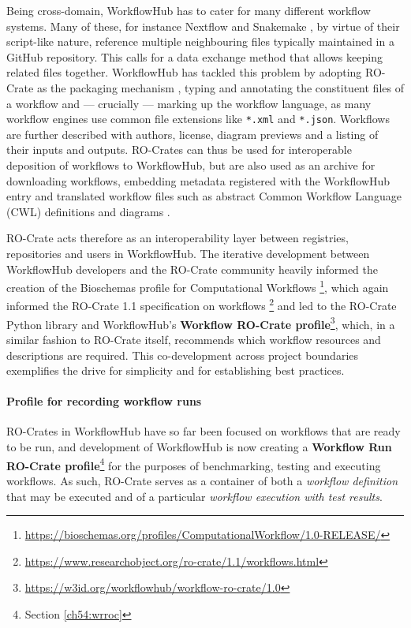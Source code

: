 Being cross-domain, WorkflowHub has to cater for many different workflow
systems. Many of these, for instance Nextflow
\cite{Di Tommaso 2017} and Snakemake
\cite{Koster 2012}, by
virtue of their script-like nature, reference multiple neighbouring
files typically maintained in a GitHub repository. This calls for a data
exchange method that allows keeping related files together. WorkflowHub
has tackled this problem by adopting RO-Crate as the packaging mechanism
\cite{Bietrix 2021}, typing and
annotating the constituent files of a workflow and --- crucially ---
marking up the workflow language, as many workflow engines use common
file extensions like \texttt{*.xml} and \texttt{*.json}. Workflows are
further described with authors, license, diagram previews and a listing
of their inputs and outputs. RO-Crates can thus be used for
interoperable deposition of workflows to WorkflowHub, but are also used
as an archive for downloading workflows, embedding metadata registered
with the WorkflowHub entry and translated workflow files such as
abstract Common Workflow Language (CWL)
\cite{Crusoe 2022} definitions and
diagrams \cite{Goble 2021}.

RO-Crate acts therefore as an interoperability layer between registries,
repositories and users in WorkflowHub. The iterative development between
WorkflowHub developers and the RO-Crate community heavily informed the
creation of the Bioschemas
\cite{Gray 2017} profile for Computational
Workflows \footnote{\url{https://bioschemas.org/profiles/ComputationalWorkflow/1.0-RELEASE/}}, which again informed the
RO-Crate
1.1 specification on workflows \footnote{\url{https://www.researchobject.org/ro-crate/1.1/workflows.html}} and led to the RO-Crate Python library
\cite{ro-crate-py} and
WorkflowHub's
\textbf{Workflow
RO-Crate profile}\footnote{\url{https://w3id.org/workflowhub/workflow-ro-crate/1.0}}, which, in a similar fashion to RO-Crate itself,
recommends which workflow resources and descriptions are required. This
co-development across project boundaries exemplifies the drive for
simplicity and for establishing best practices.

\paragraph{Profile for recording workflow runs}
\label{ch5:profile-for-recording-workflow-runs}

RO-Crates in WorkflowHub have so far been focused on workflows that are
ready to be run, and development of WorkflowHub is now creating a
\textbf{Workflow Run RO-Crate profile}\footnote{Section \vref{ch54:wrroc}} for the purposes of benchmarking,
testing and executing workflows. As such, RO-Crate serves as a container
of both a \emph{workflow definition} that may be executed and of a
particular \emph{workflow execution with test results}.

